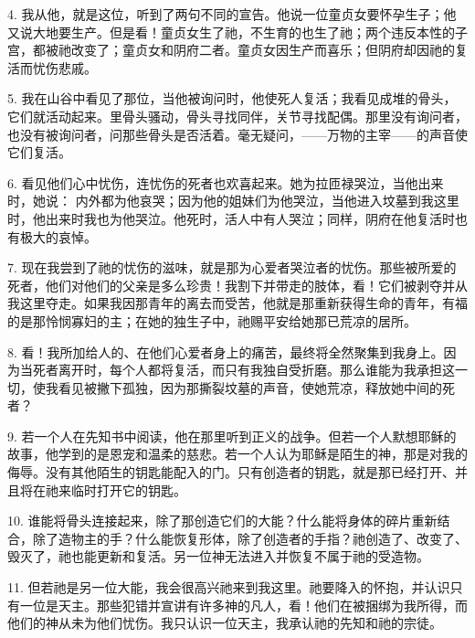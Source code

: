 4. 我从他，就是这位，听到了两句不同的宣告。他说一位童贞女要怀孕生子；他又说大地要生产。但是看！童贞女生了祂，不生育的也生了祂；两个违反本性的子宫，都被祂改变了；童贞女和阴府二者。童贞女因生产而喜乐；但阴府却因祂的复活而忧伤悲戚。\par

5. 我在山谷中看见了那位，当他被询问时，他使死人复活；我看见成堆的骨头，它们就活动起来。里骨头骚动，骨头寻找同伴，关节寻找配偶。那里没有询问者，也没有被询问者，问那些骨头是否活着。毫无疑问，——万物的主宰——的声音使它们复活。\par

6. 看见他们心中忧伤，连忧伤的死者也欢喜起来。她为拉匝禄哭泣，当他出来时，她说： 内外都为他哀哭；因为他的姐妹们为他哭泣，当他进入坟墓到我这里时，他出来时我也为他哭泣。他死时，活人中有人哭泣；同样，阴府在他复活时也有极大的哀悼。\par

7. 现在我尝到了祂的忧伤的滋味，就是那为心爱者哭泣者的忧伤。那些被所爱的死者，他们对他们的父亲是多么珍贵！我割下并带走的肢体，看！它们被剥夺并从我这里夺走。如果我因那青年的离去而受苦，他就是那重新获得生命的青年，有福的是那怜悯寡妇的主；在她的独生子中，祂赐平安给她那已荒凉的居所。\par

8. 看！我所加给人的、在他们心爱者身上的痛苦，最终将全然聚集到我身上。因为当死者离开时，每个人都将复活，而只有我独自受折磨。那么谁能为我承担这一切，使我看见被撇下孤独，因为那撕裂坟墓的声音，使她荒凉，释放她中间的死者？\par

9. 若一个人在先知书中阅读，他在那里听到正义的战争。但若一个人默想耶稣的故事，他学到的是恩宠和温柔的慈悲。若一个人认为耶稣是陌生的神，那是对我的侮辱。没有其他陌生的钥匙能配入的门。只有创造者的钥匙，就是那已经打开、并且将在祂来临时打开它的钥匙。\par

10. 谁能将骨头连接起来，除了那创造它们的大能？什么能将身体的碎片重新结合，除了造物主的手？什么能恢复形体，除了创造者的手指？祂创造了、改变了、毁灭了，祂也能更新和复活。另一位神无法进入并恢复不属于祂的受造物。\par

11. 但若祂是另一位大能，我会很高兴祂来到我这里。祂要降入的怀抱，并认识只有一位是天主。那些犯错并宣讲有许多神的凡人，看！他们在被捆绑为我所得，而他们的神从未为他们忧伤。我只认识一位天主，我承认祂的先知和祂的宗徒。\par

